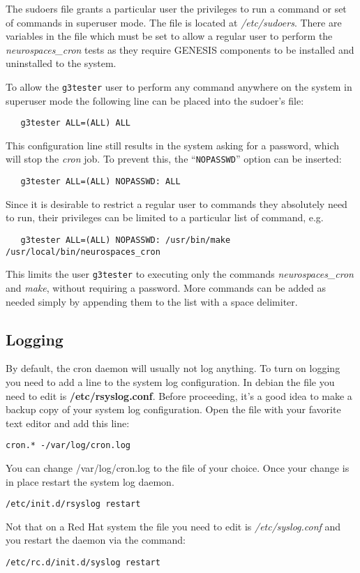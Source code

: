 \documentclass[12pt]{article}
\begin{document}
The sudoers file grants a particular user the privileges to run a command or set of commands in superuser mode. The file is located at {\it /etc/sudoers}. There are variables in the file which must be set to allow a regular user to perform the {\it neurospaces\_cron} tests as they require GENESIS components to be installed and uninstalled to the system.

To allow the {\tt g3tester} user to perform any command anywhere on the system in superuser mode the following line can be placed into the sudoer's file:
\begin{verbatim}
   g3tester ALL=(ALL) ALL
\end{verbatim}
This configuration line still results in the system asking for a password, which will stop the {\it cron} job. To prevent this, the ``{\tt NOPASSWD}'' option can be inserted:
\begin{verbatim}
   g3tester ALL=(ALL) NOPASSWD: ALL
\end{verbatim}
Since it is desirable to restrict a regular user to commands they absolutely need to run, their privileges can be limited to a particular list of command, e.g.
\begin{verbatim}
   g3tester ALL=(ALL) NOPASSWD: /usr/bin/make /usr/local/bin/neurospaces_cron
\end{verbatim}
This limits the user {\tt g3tester} to executing only the commands {\it neurospaces\_cron} and {\it make}, without requiring a password. More commands can be added as needed simply by appending them to the list with a space delimiter. 

\subsection*{Logging}

By default, the cron daemon will usually not log anything. To turn on logging you need to add a line to the system log configuration. In debian the file you need to edit is {\bf /etc/rsyslog.conf}. Before proceeding, it's a good idea to make a backup copy of your system log configuration. Open the file with your favorite text editor and add this line:

\begin{verbatim}
cron.* -/var/log/cron.log
\end{verbatim}

You can change /var/log/cron.log to the file of your choice. Once your change is in place restart the system log daemon. 

\begin{verbatim}
/etc/init.d/rsyslog restart
\end{verbatim}

Not that on a Red Hat system the file you need to edit is {\it /etc/syslog.conf} and you restart the daemon via the command:

\begin{verbatim}
/etc/rc.d/init.d/syslog restart
\end{verbatim}
\end{document}
